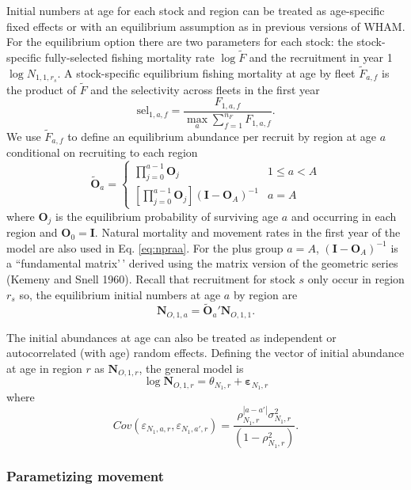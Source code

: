 \documentclass[
]{article}
\begin{document}
Initial numbers at age for each stock and region can be treated as
age-specific fixed effects or with an equilibrium assumption as in
previous versions of WHAM. For the equilibrium option there are two
parameters for each stock: the stock-specific fully-selected fishing
mortality rate \(\log \widetilde{F}\) and the recruitment in year 1
\(\log N_{1,1,r_s}\). A stock-specific equilibrium fishing mortality at
age by fleet \({\tilde F}_{a,f}\) is the product of \(\widetilde{F}\)
and the selectivity across fleets in the first year \begin{equation*}
  \text{sel}_{1,a,f} = \frac{F_{1,a,f}}{\max_a \sum_{f=1}^{n_F} F_{1,a,f}}.
\end{equation*} We use \(\widetilde{F}_{a,f}\) to define an equilibrium
abundance per recruit by region at age \(a\) conditional on recruiting
to each region \begin{equation}\label{eq:npraa}
 \widetilde{\mathbf{O}}_{a} = \left\{
 \begin{array}{ll}
\prod^{a-1}_{j=0}\mathbf{O}_{j}  & 1\leq a<A\\
\left[\prod^{a-1}_{j=0}\mathbf{O}_{j}\right] \left(\mathbf{I} - \mathbf{O}_{A}\right)^{-1} & a = A
 \end{array}
\right.
\end{equation} where \(\mathbf{O}_{j}\) is the equilibrium probability
of surviving age \(a\) and occurring in each region and
\(\mathbf{O}_{0} = \mathbf{I}\). Natural mortality and movement rates in
the first year of the model are also used in Eq. \ref{eq:npraa}. For the
plus group \(a=A\), \(\left(\mathbf{I} - \mathbf{O}_{A}\right)^{-1}\) is
a ``fundamental matrix'\,' derived using the matrix version of the
geometric series (Kemeny and Snell 1960). Recall that recruitment for
stock \(s\) only occur in region \(r_s\) so, the equilibrium initial
numbers at age \(a\) by region are
\[\mathbf{N}_{O,1,a} = \widetilde{\mathbf{O}}_{a}' \mathbf{N}_{O,1,1}.\]

The initial abundances at age can also be treated as independent or
autocorrelated (with age) random effects. Defining the vector of initial
abundance at age in region \(r\) as \(\mathbf{N}_{O,1,r}\), the general
model is
\[\log \mathbf{N}_{O,1,r} = \theta_{N_1,r} + \boldsymbol{\varepsilon}_{N_1,r}\]
where
\[  Cov\left(\varepsilon_{N_1,a,r},\varepsilon_{N_1,a',r}\right) = \frac{\rho_{N_1,r}^{|a-a'|}\sigma^2_{N_1,r}} {\left(1-\rho_{N_1,r}^2\right)}.\]

\hypertarget{parametizing-movement}{%
\subsubsection*{Parametizing movement}\label{parametizing-movement}}
\end{document}
